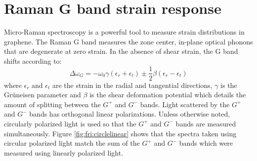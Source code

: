 \section{Raman G band strain response}
Micro-Raman spectroscopy is a powerful tool to measure strain distributions in graphene.
The Raman G band measures the zone center, in-plane optical phonons that are degenerate at zero strain.
In the absence of shear strain, the G band shifts according to\cite{Huang2009}:
\begin{equation}
	\Delta \omega_G=-\omega_0 \gamma(\epsilon_{r}+\epsilon_{t}) \pm \frac{1}{2} \beta (\epsilon_{r}-\epsilon_{t})
\end{equation}
where $\epsilon_{r}$ and $\epsilon_{t}$ are the strain in the radial and tangential directions,  $\gamma$ is the Gr\"{u}neisen parameter and $\beta$ is the shear deformation potential which details the amount of splitting between the $G^+$ and $G^-$ bands.
Light scattered by the $G^+$ and $G^-$  bands has orthogonal linear polarizations\cite{Huang2009}.
Unless otherwise noted, circularly polarized light is used so that the $G^+$ and $G^-$ bands are measured simultaneously.
Figure \ref{fig:fri:circlelinear} shows that the spectra taken using circular polarized light match the sum of the $G^+$ and $G^-$ bands which were measured using linearly polarized light.

